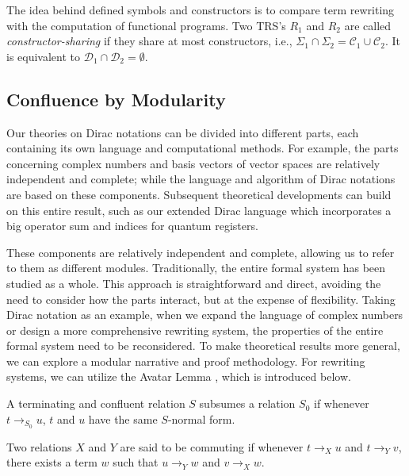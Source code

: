 \documentclass[manuscript, review, timestamp]{acmart}
\begin{document}
The idea behind defined symbols and constructors is to compare term rewriting with the computation of functional programs. Two TRS's $R_1$ and $R_2$ are called \textit{constructor-sharing} if they share at most constructors, i.e., $\Sigma_1 \cap \Sigma_2 = \mathcal{C}_1 \cup \mathcal{C}_2$. It is equivalent to $\mathcal{D}_1 \cap \mathcal{D}_2 = \emptyset$.


\subsection{Confluence by Modularity}
\label{sec: conf-modular}

Our theories on Dirac notations can be divided into different parts, each containing its own language and computational methods. For example, the parts concerning complex numbers and basis vectors of vector spaces are relatively independent and complete; while the language and algorithm of Dirac notations are based on these components. Subsequent theoretical developments can build on this entire result, such as our extended Dirac language which incorporates a big operator sum and indices for quantum registers.

These components are relatively independent and complete, allowing us to refer to them as different modules. Traditionally, the entire formal system has been studied as a whole. This approach is straightforward and direct, avoiding the need to consider how the parts interact, but at the expense of flexibility. Taking Dirac notation as an example, when we expand the language of complex numbers or design a more comprehensive rewriting system, the properties of the entire formal system need to be reconsidered. 
To make theoretical results more general, we can explore a modular narrative and proof methodology. For rewriting systems, we can utilize the Avatar Lemma \cite{Arrighi2005}\cite{Arrighi2017}, which is introduced below.



\begin{definition}[Subsumption]
  A terminating and confluent relation $S$ subsumes a relation $S_0$ if whenever $t \to_{S_0} u$, $t$ and $u$ have the same $S$-normal form.
\end{definition}

\begin{definition}
  Two relations $X$ and $Y$ are said to be commuting if whenever $t \to_X u$ and $t \to_Y v$, there exists a term $w$ such that $u \to_Y w$ and $v \to_X w$.
\end{definition}
\end{document}
